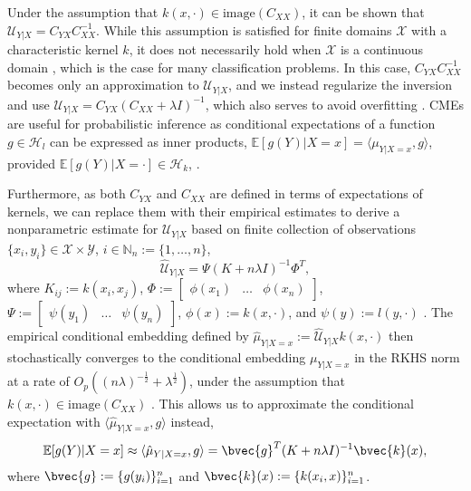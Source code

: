 \documentclass[twoside]{article}
\begin{document}
			Under the assumption that $k(x, \cdot) \in \mathrm{image}(C_{XX})$, it can be shown that $\mathcal{U}_{Y | X} = C_{YX} C_{XX}^{-1}$. While this assumption is satisfied for finite domains $\mathcal{X}$ with a characteristic kernel $k$, it does not necessarily hold when $\mathcal{X}$ is a continuous domain \citep{fukumizu2004dimensionality}, which is the case for many classification problems. In this case, $C_{YX} C_{XX}^{-1}$ becomes only an approximation to $\mathcal{U}_{Y | X}$, and we instead regularize the inversion and use $\mathcal{U}_{Y | X} = C_{YX} (C_{XX} + \lambda I)^{-1}$, which also serves to avoid overfitting \citep{song2013kernel}. \glspl{CME} are useful for probabilistic inference as conditional expectations of a function $g \in \mathcal{H}_{l}$ can be expressed as inner products, $\mathbb{E}[g(Y) | X = x] = \langle \mu_{Y | X = x}, g \rangle$, provided $\mathbb{E}[g(Y) | X = \cdot] \in \mathcal{H}_{k}$, \citet[Theorem 4]{song2009hilbert}.
				
			Furthermore, as both $C_{YX}$ and $C_{XX}$ are defined in terms of expectations of kernels, we can replace them with their empirical estimates to derive a nonparametric estimate for $\mathcal{U}_{Y | X}$ based on finite collection of observations $\{x_{i}, y_{i}\} \in \mathcal{X} \times \mathcal{Y}$, $i \in \mathbb{N}_{n} := \{1, \dots, n\}$,
			\begin{equation}
			\hat{\mathcal{U}}_{Y | X} = \Psi (K + n \lambda I)^{-1} \Phi^{T},
			\label{eq:empirical_conditional_embedding}
			\end{equation}
			where $K_{ij} := k(x_{i}, x_{j})$, $\Phi := \begin{bmatrix} \phi(x_{1}) & \dots & \phi(x_{n}) \end{bmatrix}$, $\Psi := \begin{bmatrix} \psi(y_{1}) & \dots & \psi(y_{n}) \end{bmatrix}$, $\phi(x) := k(x, \cdot)$, and $\psi(y) := l(y, \cdot)$ \citep{song2013kernel}. The empirical conditional embedding defined by $\hat{\mu}_{Y | X = x} := \hat{\mathcal{U}}_{Y | X} k(x, \cdot)$ then stochastically converges to the conditional embedding $\mu_{Y | X = x}$ in the RKHS norm at a rate of $O_{p}((n \lambda)^{-\frac{1}{2}} + \lambda^{\frac{1}{2}})$, under the assumption that $k(x, \cdot) \in \mathrm{image}(C_{XX})$ \cite[Theorem 6]{song2009hilbert}. This allows us to approximate the conditional expectation with $\langle \hat{\mu}_{Y | X = x}, g \rangle$ instead, 
			\begin{equation}
			\mathbb{E}[g(Y) | X = x] \approx \langle \hat{\mu}_{Y | X = x}, g \rangle = \bvec{g}^{T} (K + n \lambda I)^{-1} \bvec{k}(x),
			\label{eq:empirical_conditional_expectation}
			\end{equation}
			where $\bvec{g} := \{g(y_{i})\}_{i = 1}^{n}$ and $\bvec{k}(x) := \{k(x_{i}, x)\}_{i = 1}^{n}$.
			
\end{document}
